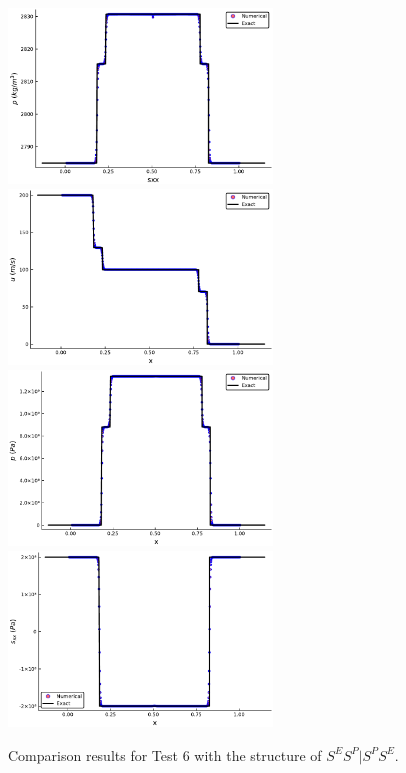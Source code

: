 \documentclass{article}
\numberwithin{equation}{section}
\numberwithin{table}{section}
\begin{document}
\begin{figure}[ht]
  \centering
 \includegraphics[width= 7cm] {case21rho.pdf}
  \includegraphics[width= 7cm] {case21u.pdf}
  \includegraphics[width= 7cm] {case21p.pdf}
  \includegraphics[width= 7cm] {case21sxx.pdf}
    \caption{Comparison results for Test 6 with the structure of $S^ES^P|S^PS^E$.  }
  \label{fig:case21}
\end{figure}
\end{document}
